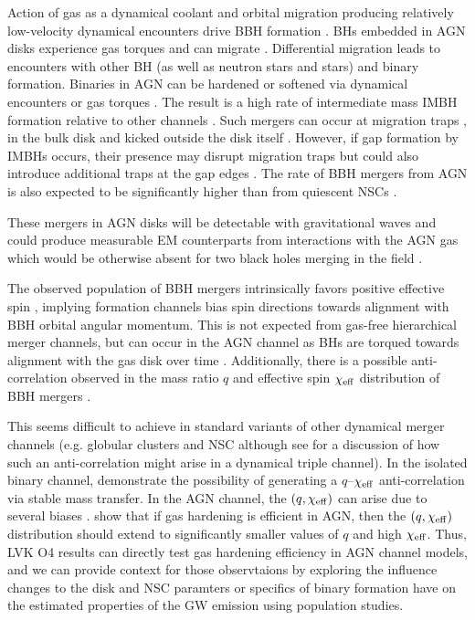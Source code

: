 Action of gas as a dynamical coolant and orbital migration producing relatively low-velocity dynamical encounters drive BBH formation \citep[e.g.][]{Rowan+23,QianLiLai24,DodiciTremaine24}.
BHs embedded in AGN disks experience gas torques and can migrate \citep[e.g.][]{Syer+91,Levin07,McKernan+12}.
Differential migration leads to encounters with other BH (as well as neutron stars and stars) and binary formation.
Binaries in AGN can be hardened or softened via dynamical encounters \citep[e.g.][]{Leigh+18,Samsing+20,Wang+21} or gas torques  \citep[e.g.][]{Tiede+20,Derdzinski+21,YapingLi+21}.
The result is a high rate of intermediate mass IMBH formation relative to other channels \citep{McKernan+12,Bellovary+16,Secunda+21,Yang+19,McKernan+20a,TagawaHaimanKocsis20,Vaccaro+24}.
Such mergers can occur at migration traps \citep[e.g.][]{Lyra+10,Sandor+11,Horn+12,Bellovary+16,Yang+19,Secunda+20}, in the bulk disk \citep[e.g.][]{Tagawa+20spin,McKernan+20a} and kicked outside the disk itself \citep{Tagawa+20b}.
However, if gap formation by IMBHs occurs, their presence may disrupt migration traps \citep{Gilbaum+25} but could also introduce additional traps at the gap edges \citep{Horn+12}.
The rate of BBH mergers from AGN is also expected to be significantly higher than from quiescent NSCs \citep{FordMcKernan22}.

These mergers in AGN disks will be detectable with gravitational waves \citep{McKernan+14,Bartos+17,Stone+17,Secunda+19} and could produce measurable EM counterparts from interactions with the AGN gas which would be otherwise absent for two black holes merging in the field \citep{McKernan+19,Perna+21}.

The observed population of BBH mergers intrinsically favors positive effective spin \citep{Abbott+23-O3b}, implying formation channels bias spin directions towards alignment with BBH orbital angular momentum.
This is not expected from gas-free hierarchical merger channels, but can occur in the AGN channel as BHs are torqued towards alignment with the gas disk over time \citep{Tagawa+20spin,Vajpeyi+22,McKernanFord24}.
Additionally, there is a possible anti-correlation observed in the mass ratio $q$ and effective spin $\chi_{\rm eff}$ distribution of BBH mergers \citep{Callister+21}.

This seems difficult to achieve in standard variants of other dynamical merger channels (e.g. globular clusters and NSC although see \citet{Su25} for a discussion of how such an anti-correlation might arise in a dynamical triple channel).
In the isolated binary channel, \citep[e.g.][]{Olejak+24,BanerjeeOlejak24} demonstrate the possibility of generating a $q$--$\chi_{\rm eff}$ anti-correlation via stable mass transfer.
In the AGN channel, the $(q,\chi_{\rm eff})$ can arise due to several biases \citep{McKernan+22:q-Xeff,Santini+23, DittmannDempseyLi24}.
\citet{Vaccaro+24} show that if gas hardening is efficient in AGN, then the $(q,\chi_{\rm eff})$ distribution should extend to significantly smaller values of $q$ and high $\chi_{\rm eff}$.
Thus, LVK O4 results can directly test gas hardening efficiency in AGN channel models, and we can provide context for those observtaions by exploring the influence changes to the disk and NSC paramters or specifics of binary formation have on the estimated properties of the GW emission using population studies.

